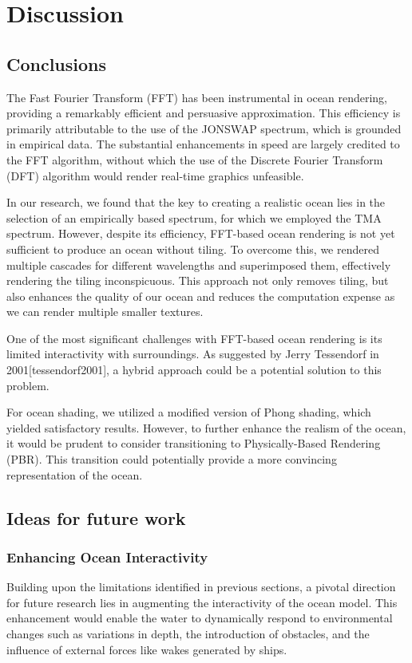 \justifying
\chapter{Discussion}
\label{chapter4}

\section{Conclusions}

The Fast Fourier Transform (FFT) has been instrumental in ocean rendering, providing a remarkably efficient and persuasive approximation. This efficiency is primarily attributable to the use of the JONSWAP spectrum, which is grounded in empirical data. The substantial enhancements in speed are largely credited to the FFT algorithm, without which the use of the Discrete Fourier Transform (DFT) algorithm would render real-time graphics unfeasible.

In our research, we found that the key to creating a realistic ocean lies in the selection of an empirically based spectrum, for which we employed the TMA spectrum. However, despite its efficiency, FFT-based ocean rendering is not yet sufficient to produce an ocean without tiling. To overcome this, we rendered multiple cascades for different wavelengths and superimposed them, effectively rendering the tiling inconspicuous. This approach not only removes tiling, but also enhances the quality of our ocean and reduces the computation expense as we can render multiple smaller textures.

One of the most significant challenges with FFT-based ocean rendering is its limited interactivity with surroundings. As suggested by Jerry Tessendorf in 2001[tessendorf2001], a hybrid approach could be a potential solution to this problem.

For ocean shading, we utilized a modified version of Phong shading, which yielded satisfactory results. However, to further enhance the realism of the ocean, it would be prudent to consider transitioning to Physically-Based Rendering (PBR). This transition could potentially provide a more convincing representation of the ocean.


\section{Ideas for future work}
\subsection{Enhancing Ocean Interactivity} 
Building upon the limitations identified in previous sections, a pivotal direction for future research lies in augmenting the interactivity of the ocean model. This enhancement would enable the water to dynamically respond to environmental changes such as variations in depth, the introduction of obstacles, and the influence of external forces like wakes generated by ships. 

